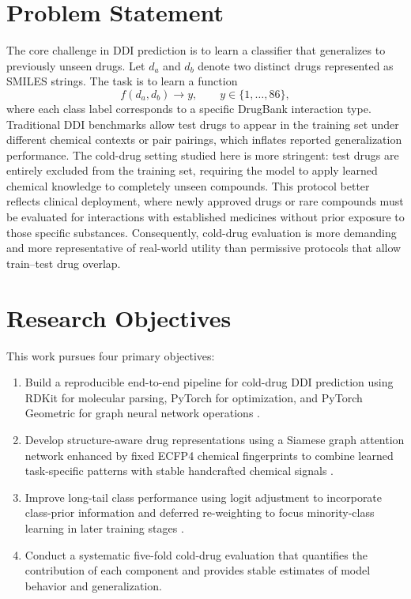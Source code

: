 \documentclass[11pt,a4paper]{report}
\begin{document}
\section{Problem Statement}
The core challenge in DDI prediction is to learn a classifier that generalizes to previously unseen drugs. Let \(d_a\) and \(d_b\) denote two distinct drugs represented as SMILES strings. The task is to learn a function
\begin{equation}
f(d_a, d_b) \rightarrow y, \qquad y \in \{1,\dots,86\},
\end{equation}
where each class label corresponds to a specific DrugBank interaction type. Traditional DDI benchmarks allow test drugs to appear in the training set under different chemical contexts or pair pairings, which inflates reported generalization performance. The cold-drug setting studied here is more stringent: test drugs are entirely excluded from the training set, requiring the model to apply learned chemical knowledge to completely unseen compounds. This protocol better reflects clinical deployment, where newly approved drugs or rare compounds must be evaluated for interactions with established medicines without prior exposure to those specific substances. Consequently, cold-drug evaluation is more demanding and more representative of real-world utility than permissive protocols that allow train--test drug overlap.
\section{Research Objectives}
This work pursues four primary objectives:
\begin{enumerate}
\item Build a reproducible end-to-end pipeline for cold-drug DDI prediction using RDKit for molecular parsing, PyTorch for optimization, and PyTorch Geometric for graph neural network operations \cite{fey2019pyg}.
\item Develop structure-aware drug representations using a Siamese graph attention network enhanced by fixed ECFP4 chemical fingerprints to combine learned task-specific patterns with stable handcrafted chemical signals \cite{velickovic2018gat, rogers2010ecfp}.
\item Improve long-tail class performance using logit adjustment to incorporate class-prior information and deferred re-weighting to focus minority-class learning in later training stages \cite{menon2021logit, cao2019ldam}.
\item Conduct a systematic five-fold cold-drug evaluation that quantifies the contribution of each component and provides stable estimates of model behavior and generalization.
\end{enumerate}
\end{document}

